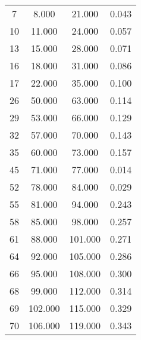 % 
\begin{tabular}{cccc}
  \hline
  \hline
7 & 8.000 & 21.000 & 0.043 \\ 
  10 & 11.000 & 24.000 & 0.057 \\ 
  13 & 15.000 & 28.000 & 0.071 \\ 
  16 & 18.000 & 31.000 & 0.086 \\ 
  17 & 22.000 & 35.000 & 0.100 \\ 
  26 & 50.000 & 63.000 & 0.114 \\ 
  29 & 53.000 & 66.000 & 0.129 \\ 
  32 & 57.000 & 70.000 & 0.143 \\ 
  35 & 60.000 & 73.000 & 0.157 \\ 
  45 & 71.000 & 77.000 & 0.014 \\ 
  52 & 78.000 & 84.000 & 0.029 \\ 
  55 & 81.000 & 94.000 & 0.243 \\ 
  58 & 85.000 & 98.000 & 0.257 \\ 
  61 & 88.000 & 101.000 & 0.271 \\ 
  64 & 92.000 & 105.000 & 0.286 \\ 
  66 & 95.000 & 108.000 & 0.300 \\ 
  68 & 99.000 & 112.000 & 0.314 \\ 
  69 & 102.000 & 115.000 & 0.329 \\ 
  70 & 106.000 & 119.000 & 0.343 \\ 
   \hline
\end{tabular}
